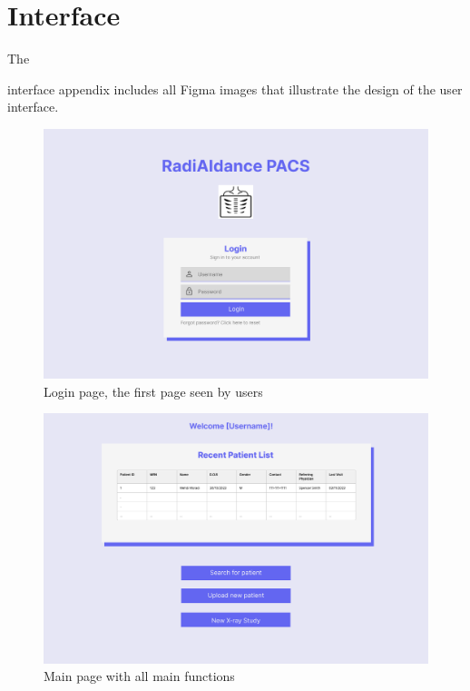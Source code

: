 \documentclass[12pt, titlepage]{article}
\begin{document}
% 

\newpage{}

\appendix

\section{Interface}
\hypertarget{A}{The} interface appendix includes all Figma images that illustrate the design of the user interface. 

\begin{figure}[H]
    \centering
    \includegraphics[scale=0.30]{chest-x-ray-ai.png}
    \caption{Login page, the first page seen by users}
    \label{fig:LoginPage}
\end{figure}
\begin{figure}[H]
    \centering
    \includegraphics[scale=0.30]{chest-x-ray-ai (6).png}
    \caption{Main page with all main functions}
    \label{fig:MainPage}
\end{figure}
\end{document}
